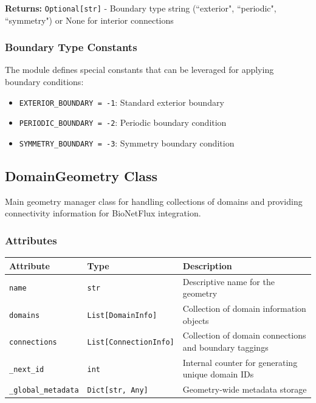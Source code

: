 \textbf{Returns:} \texttt{Optional[str]} - Boundary type string (``exterior", ``periodic", ``symmetry") or None for interior connections

\subsubsection{Boundary Type Constants}
The module defines special constants that can be leveraged for applying boundary conditions:
\begin{itemize}
	\item \texttt{EXTERIOR\_BOUNDARY = -1}: Standard exterior boundary
	\item \texttt{PERIODIC\_BOUNDARY = -2}: Periodic boundary condition
	\item \texttt{SYMMETRY\_BOUNDARY = -3}: Symmetry boundary condition
\end{itemize}

\subsection{DomainGeometry Class}
\label{subsec:domaingeometry_class}

Main geometry manager class for handling collections of domains and providing connectivity information for BioNetFlux integration.

\subsubsection{Attributes}

\begin{longtable}{|p{3.5cm}|p{4cm}|p{7cm}|}
\hline
\textbf{Attribute} & \textbf{Type} & \textbf{Description} \\
\hline
\endhead

\texttt{name} & \texttt{str} & Descriptive name for the geometry \\
\hline

\texttt{domains} & \texttt{List[DomainInfo]} & Collection of domain information objects \\
\hline

\texttt{connections} & \texttt{List[ConnectionInfo]} & Collection of domain connections and boundary taggings \\
\hline

\texttt{\_next\_id} & \texttt{int} & Internal counter for generating unique domain IDs \\
\hline

\texttt{\_global\_metadata} & \texttt{Dict[str, Any]} & Geometry-wide metadata storage \\
\hline

\end{longtable}

